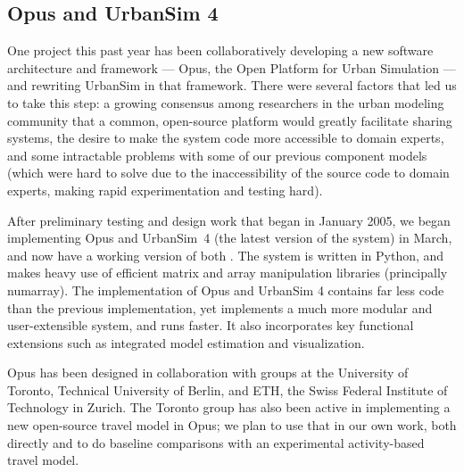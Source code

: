 \documentclass{acm_proc_article-sp}
\begin{document}
\subsection{Opus and UrbanSim 4}
\label{opus}

One project this past year has been collaboratively
developing a new software architecture and framework --- Opus, the Open
Platform for Urban Simulation --- and rewriting UrbanSim in that framework.
There were several factors that led us to take this step: a growing
consensus among researchers in the urban modeling community that a common,
open-source platform would greatly facilitate sharing systems,
the desire to make the system code more accessible to domain experts, and
some intractable problems with some of our previous component models (which
were hard to solve due to the inaccessibility of the source code to domain
experts, making rapid experimentation and testing hard).

After preliminary testing and design work that began in January
2005, we began implementing Opus and UrbanSim~4 (the latest
version of the system) in March, and now have a working version of
both \cite{waddell-opus-2005}. The system is written in Python,
and makes heavy use of efficient matrix and array manipulation
libraries (principally numarray).  The implementation of Opus and
UrbanSim 4 contains far less code than the previous
implementation, yet implements a much more modular and
user-extensible system, and runs faster.  It also incorporates key
functional extensions such as integrated model estimation and
visualization.

Opus has been designed in collaboration with groups at the
University of Toronto, Technical University of Berlin, and ETH,
the Swiss Federal Institute of Technology in Zurich. The Toronto
group has also been active in implementing a new open-source travel
model in Opus; we plan to use that in our own work,
both directly and to do baseline comparisons with an experimental
activity-based travel model.

%
\end{document}
